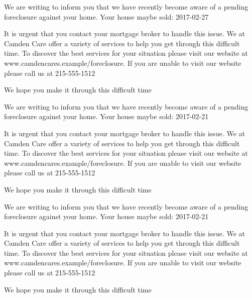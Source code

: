 \documentclass[10pt,stdletter]{newlfm}
\begin{document}
\pagebreak
{}
\begin{newlfm}

We are writing to inform you that we have recently become aware of a pending foreclosure against your home. Your house maybe sold: 2017-02-27

It is urgent that you contact your mortgage broker to handle this issue.
We at Camden Care offer a variety of services to help you get through this difficult time. To discover the best services for your situation please visit our website at www.camdencares.example/foreclosure.
If you are unable to visit our website please call us at 215-555-1512

We hope you make it through this difficult time

\end{newlfm}
\pagebreak
{}
\begin{newlfm}

We are writing to inform you that we have recently become aware of a pending foreclosure against your home. Your house maybe sold: 2017-02-21

It is urgent that you contact your mortgage broker to handle this issue.
We at Camden Care offer a variety of services to help you get through this difficult time. To discover the best services for your situation please visit our website at www.camdencares.example/foreclosure.
If you are unable to visit our website please call us at 215-555-1512

We hope you make it through this difficult time

\end{newlfm}
\pagebreak
{}
\begin{newlfm}

We are writing to inform you that we have recently become aware of a pending foreclosure against your home. Your house maybe sold: 2017-02-21

It is urgent that you contact your mortgage broker to handle this issue.
We at Camden Care offer a variety of services to help you get through this difficult time. To discover the best services for your situation please visit our website at www.camdencares.example/foreclosure.
If you are unable to visit our website please call us at 215-555-1512

We hope you make it through this difficult time

\end{newlfm}
\end{document}
